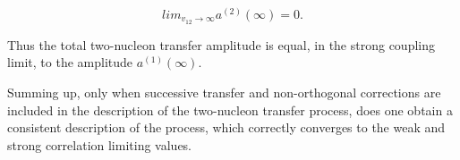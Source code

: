 \documentclass[a4paper,14pt]{article}
\begin{document}
\begin{equation}
lim_{v_{12} \to \infty} a^{(2)} (\infty) = 0.
\end{equation} 

Thus the total two-nucleon transfer amplitude is equal, in the strong coupling limit, to the amplitude $a^{(1)} (\infty)$.


Summing up, only when successive transfer and non-orthogonal corrections are included in the description of the two-nucleon 
transfer process, does one obtain a consistent description of the process, which correctly converges to the weak and 
strong correlation limiting values.
\end{document}

